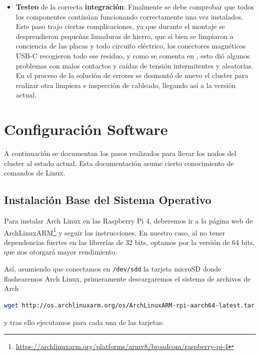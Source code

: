\begin{itemize}
    \item \textbf{Testeo} de la correcta \textbf{integración}: Finalmente se debe comprobar que todos los componentes continúan funcionando correctamente una vez instalados. Este paso trajo ciertas complicaciones, ya que durante el montaje se desprendieron pequeñas limaduras de hierro, que si bien se limpiaron a conciencia de las placas y todo circuito eléctrico, los conectores magnéticos USB-C recogieron todo ese residuo, y como se comenta en , esto dió algunos problemas con malos contactos y caídas de tensión intermitentes y aleatorias. En el proceso de la solución de errores se desmontó de nuevo el cluster para realizar otra limpieza e inspección de cableado, llegando así a la versión actual.
\end{itemize}

\section{Configuración Software}
\label{sec:configuracion_software}
A continuación se documentan los pasos realizados para llevar los nodos del cluster al estado actual. Esta documentación asume cierto conocimiento de comandos de Linux.

\subsection{Instalación Base del Sistema Operativo}
\label{ssec:instalacion_sistema_operativo}
Para instalar Arch Linux en las Raspberry Pi 4, deberemos ir a la página web de ArchLinuxARM\footnote{\url{https://archlinuxarm.org/platforms/armv8/broadcom/raspberry-pi-4}} y seguir las instrucciones. En nuestro caso, al no tener dependencias fuertes en las librerías de 32 bits, optamos por la versión de 64 bits, que nos otorgará mayor rendimiento.

Así, asumiendo que conectamos en \texttt{/dev/sdd} la tarjeta microSD donde flashearemos Arch Linux, primeramente descargaremos el sistema de archivos de Arch

\begin{lstlisting}[language=bash,basicstyle=\scriptsize]
wget http://os.archlinuxarm.org/os/ArchLinuxARM-rpi-aarch64-latest.tar.gz
\end{lstlisting}

y tras ello ejecutamos para cada una de las tarjetas:

